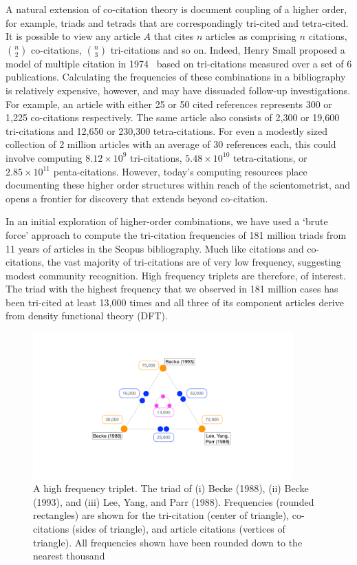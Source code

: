 \documentclass[11pt, oneside]{article}   	%
\begin{document}
A natural extension of co-citation theory is document coupling of a higher order, for example, triads and tetrads that are correspondingly tri-cited and tetra-cited. It is possible to view any article $A$ that cites $n$ articles as comprising $n$ citations, $n\choose2$ co-citations, $n\choose3$ tri-citations and so on. Indeed, Henry Small proposed a model of multiple citation in 1974~\citep{small1974multiple} based on tri-citations measured over a set of 6 publications.  Calculating the frequencies of these combinations in a bibliography is relatively expensive, however, and may have dissuaded follow-up investigations. For example, an article with either 25 or 50 cited references represents 300 or 1,225 co-citations respectively. The same article also consists of  2,300 or 19,600 tri-citations and  12,650 or  230,300 tetra-citations. For even a modestly sized collection of 2 million articles with an average of 30 references each, this could involve computing $8.12\times10^9$ tri-citations, $5.48\times10^{10}$ tetra-citations, or $2.85\times10^{11}$ penta-citations. However, today's computing resources place documenting these higher order structures within reach of the scientometrist, and opens a frontier for discovery that extends beyond co-citation.

In an initial exploration of higher-order combinations, we have used a `brute force' approach to compute the tri-citation frequencies of 181 million triads from 11 years of articles in the Scopus bibliography.  Much like citations and co-citations, the vast majority of tri-citations are of very low frequency, suggesting modest community recognition. High frequency triplets are therefore, of interest. The triad with the highest frequency that we observed in 181 million cases has been tri-cited at least 13,000 times and all three of its component articles derive from density functional theory (DFT). 
\begin{figure}[h!]
\begin{center}
\includegraphics[width=10cm]{fig1_tricite.pdf}%
\end{center}
\caption{A high frequency triplet. The triad of (i) Becke (1988), (ii) Becke (1993), and (iii) Lee, Yang, and Parr (1988).  Frequencies (rounded rectangles) are shown for the tri-citation (center of triangle), co-citations (sides of triangle), and article citations (vertices of triangle). All frequencies shown have been rounded down to the nearest thousand
}
\label{fig:fig1}
\end{figure}
\end{document}
